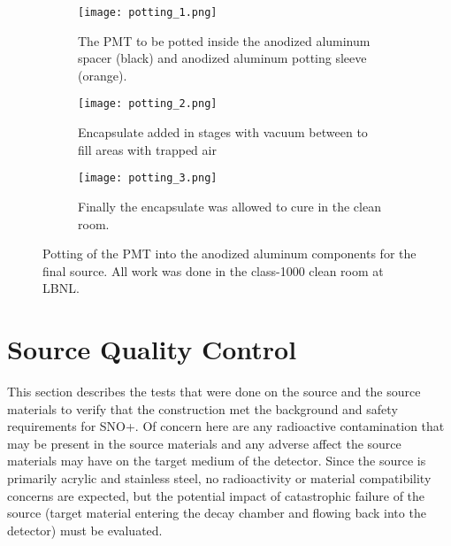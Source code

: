 \begin{figure}
\begin{subfigure}{.385\textwidth}
  \texttt{[image: potting\_1.png]}
  \caption{The PMT to be potted inside the anodized aluminum spacer (black) and anodized aluminum potting sleeve (orange).}
  \label{fig:potting_a}
\end{subfigure}
\begin{subfigure}{.305\textwidth}
  \texttt{[image: potting\_2.png]}
  \caption{Encapsulate added in stages with vacuum between to fill areas with trapped air}
  \label{fig:potting_b}
\end{subfigure}
\begin{subfigure}{.29\textwidth}
  \texttt{[image: potting\_3.png]}
  \caption{Finally the encapsulate was allowed to cure in the clean room.}
  \label{fig:potting_c}
\end{subfigure}
\caption{Potting of the PMT into the anodized aluminum components for the final source. All work was done in the class-1000 clean room at LBNL.}
\label{fig:potting}
\end{figure}

\section{Source Quality Control}
\label{chap:tests}

This section describes the tests that were done on the source and the source materials to verify that the construction met the background and safety requirements for SNO+. 
Of concern here are any radioactive contamination that may be present in the source materials and any adverse affect the source materials may have on the target medium of the detector.
Since the source is primarily acrylic and stainless steel, no radioactivity or material compatibility concerns are expected, but the potential impact of catastrophic failure of the source (target material entering the decay chamber and flowing back into the detector) must be evaluated.


